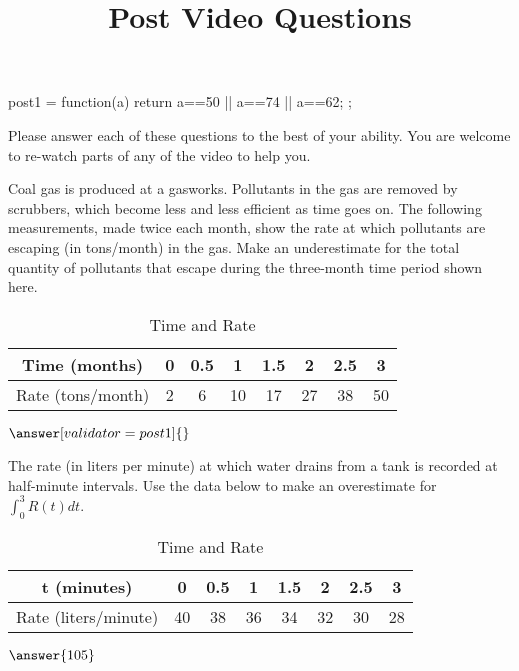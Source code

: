 \documentclass[handout]{ximera}
\title{Post Video Questions}
\begin{document}
\begin{abstract}
\end{abstract}


\maketitle

\begin{javascript}
post1 = function(a) {
    return a==50 || a==74 || a==62;
  };
\end{javascript}

Please answer each of these questions to the best of your ability. You are welcome to re-watch parts of any of the video to help you.

\begin{problem}
Coal gas is produced at a gasworks. Pollutants in the gas are removed by scrubbers, which become less and less efficient as time goes on. The following measurements, made twice each month, show the rate at which pollutants are escaping (in tons/month) in the gas. Make an underestimate for the total quantity of pollutants that escape during the three-month time period shown here.

\begin{table}[h!]
\centering
\caption{Time and Rate}
\label{my-label2}
\begin{tabular}{|c|c|c|c|c|c|c|c|}
\hline
Time (months)     & 0 & 0.5 & 1  & 1.5 & 2  & 2.5 & 3  \\
\hline
Rate (tons/month) & 2 & 6   & 10 & 17  & 27 & 38  & 50 \\
\hline
\end{tabular}
\end{table}

$\answer[validator=post1]{}$
\end{problem}

\begin{problem}
The rate (in liters per minute) at which water drains from a tank is recorded at half-minute intervals. Use the data below to make an overestimate for $\int_0^3 R(t) dt$.
\begin{table}[h!]
\centering
\caption{Time and Rate}
\label{my-label3}
\begin{tabular}{|c|c|c|c|c|c|c|c|}
\hline
t (minutes)          & 0  & 0.5 & 1  & 1.5 & 2  & 2.5 & 3  \\
\hline
Rate (liters/minute) & 40 & 38  & 36 & 34  & 32 & 30  & 28 \\
\hline
\end{tabular}
\end{table}

$\answer{105}$
\end{problem}
\end{document}
